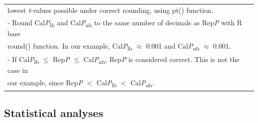 \documentclass[
  12pt,
]{article}
\begin{document}
\begin{longtable}[t]{l}
\hspace{1em}\hspace{1em}lowest \emph{t}-values possible under correct rounding, using pt() function.\\
\hspace{1em}\hspace{1em}- Round Cal\emph{P}\textsubscript{lb} and Cal\emph{P}\textsubscript{ub} to the same number of decimals as Rep\emph{P} with R base\\
\hspace{1em}\hspace{1em}round() function. In our example, Cal\emph{P}\textsubscript{lb} $\approx$ 0.001 and Cal\emph{P}\textsubscript{ub} $\approx$ 0.001.\\
\hspace{1em}\hspace{1em}- If Cal\emph{P}\textsubscript{lb} $\leq$ Rep\emph{P} $\leq$ Cal\emph{P}\textsubscript{ub}, Rep\emph{P} is considered correct. This is not the case in\\
\hspace{1em}\hspace{1em}our example, since Rep\emph{P} $<$ Cal\emph{P}\textsubscript{lb} $<$ Cal\emph{P}\textsubscript{ub}.\\*
\end{longtable}
\endgroup{}

\hypertarget{statistical-analyses}{%
\subsection{Statistical analyses}\label{statistical-analyses}}
\end{document}
